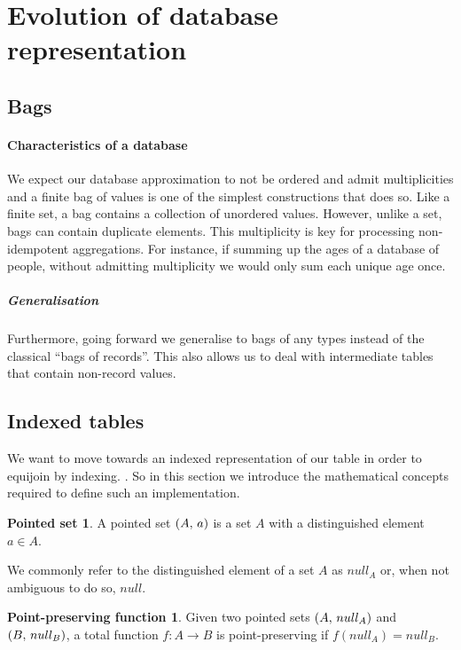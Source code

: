 \section{Evolution of database representation}
\subsection{Bags}
\paragraph{Characteristics of a database}We expect our database approximation to not be ordered and admit multiplicities and a finite bag of values is one of the simplest constructions that does so. Like a finite set, a bag contains a collection of unordered values. However, unlike a set, bags can contain duplicate elements. \cite{RelationalAlgebraByWayOfAdjunctions} This multiplicity is key for processing non-idempotent aggregations. For instance, if summing up the ages of a database of people, without admitting multiplicity we would only sum each unique age once.
\subparagraph{Generalisation}Furthermore, going forward we generalise to bags of any types instead of the classical ``bags of records''. This also allows us to deal with intermediate tables that contain non-record values.

\subsection{Indexed tables}
We want to move towards an indexed representation of our table in order to equijoin by indexing. . So in this section we introduce the mathematical concepts required to define such an implementation.
\theoremstyle{definition}\newtheorem*{psetdef}{Pointed set}
\theoremstyle{definition}\newtheorem*{ppfuncdef}{Point-preserving function}
\theoremstyle{definition}\newtheorem*{mapdef}{Map}
\theoremstyle{definition}\newtheorem*{finitemapdef}{Finite map}
\begin{psetdef}\label{def:pset}
  A pointed set $\left(A,\,a\right)$ is a set $A$ with a distinguished element $a \in A$.
\end{psetdef}
We commonly refer to the distinguished element of a set $A$ as $null_A$ or, when not ambiguous to do so, $null$.
\begin{ppfuncdef}\label{def:ppfunc}
  Given two pointed sets $\left(A,\,null_A\right)$ and $\left(B,\,null_B\right)$, a total function $f: A \rightarrow B$ is point-preserving if $f(null_A) = null_B$.
\end{ppfuncdef}

